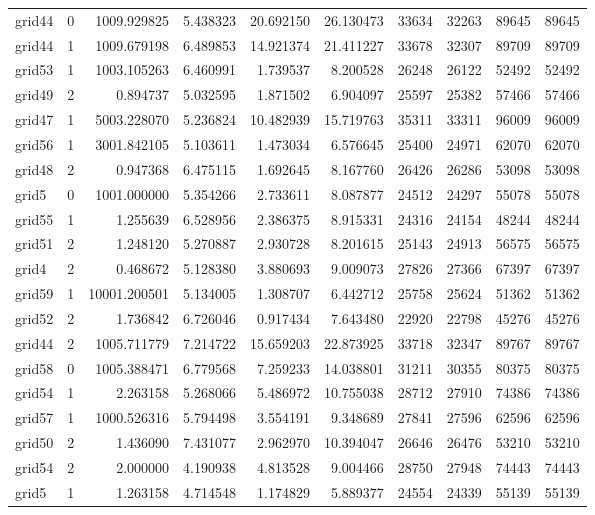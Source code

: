 \begin{longtable}{|l|r|r|r|r|r|r|r|r|r|}
grid44 & 0 & 1009.929825 & 5.438323 & 20.692150 & 26.130473 & 33634 & 32263 & 89645 & 89645 \\
grid44 & 1 & 1009.679198 & 6.489853 & 14.921374 & 21.411227 & 33678 & 32307 & 89709 & 89709 \\
grid53 & 1 & 1003.105263 & 6.460991 & 1.739537 & 8.200528 & 26248 & 26122 & 52492 & 52492 \\
grid49 & 2 & 0.894737 & 5.032595 & 1.871502 & 6.904097 & 25597 & 25382 & 57466 & 57466 \\
grid47 & 1 & 5003.228070 & 5.236824 & 10.482939 & 15.719763 & 35311 & 33311 & 96009 & 96009 \\
grid56 & 1 & 3001.842105 & 5.103611 & 1.473034 & 6.576645 & 25400 & 24971 & 62070 & 62070 \\
grid48 & 2 & 0.947368 & 6.475115 & 1.692645 & 8.167760 & 26426 & 26286 & 53098 & 53098 \\
grid5 & 0 & 1001.000000 & 5.354266 & 2.733611 & 8.087877 & 24512 & 24297 & 55078 & 55078 \\
grid55 & 1 & 1.255639 & 6.528956 & 2.386375 & 8.915331 & 24316 & 24154 & 48244 & 48244 \\
grid51 & 2 & 1.248120 & 5.270887 & 2.930728 & 8.201615 & 25143 & 24913 & 56575 & 56575 \\
grid4 & 2 & 0.468672 & 5.128380 & 3.880693 & 9.009073 & 27826 & 27366 & 67397 & 67397 \\
grid59 & 1 & 10001.200501 & 5.134005 & 1.308707 & 6.442712 & 25758 & 25624 & 51362 & 51362 \\
grid52 & 2 & 1.736842 & 6.726046 & 0.917434 & 7.643480 & 22920 & 22798 & 45276 & 45276 \\
grid44 & 2 & 1005.711779 & 7.214722 & 15.659203 & 22.873925 & 33718 & 32347 & 89767 & 89767 \\
grid58 & 0 & 1005.388471 & 6.779568 & 7.259233 & 14.038801 & 31211 & 30355 & 80375 & 80375 \\
grid54 & 1 & 2.263158 & 5.268066 & 5.486972 & 10.755038 & 28712 & 27910 & 74386 & 74386 \\
grid57 & 1 & 1000.526316 & 5.794498 & 3.554191 & 9.348689 & 27841 & 27596 & 62596 & 62596 \\
grid50 & 2 & 1.436090 & 7.431077 & 2.962970 & 10.394047 & 26646 & 26476 & 53210 & 53210 \\
grid54 & 2 & 2.000000 & 4.190938 & 4.813528 & 9.004466 & 28750 & 27948 & 74443 & 74443 \\
grid5 & 1 & 1.263158 & 4.714548 & 1.174829 & 5.889377 & 24554 & 24339 & 55139 & 55139 \\

\end{longtable}
